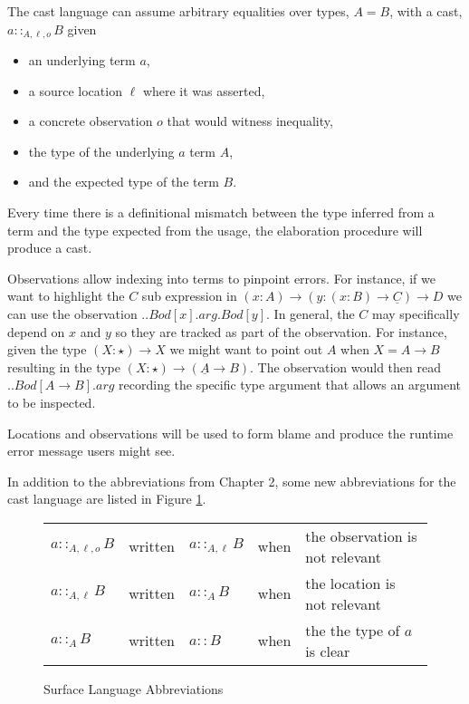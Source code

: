 The cast language can assume arbitrary equalities over types, $A=B$, with a cast, $a::_{A,\ensuremath{\ell},o}B$ given
\begin{itemize}
\item an underlying term $a$,
\item a source location $\ell$ where it was asserted,
\item a concrete observation $o$ that would witness inequality,
\item the type of the underlying $a$ term $A$,
\item and the expected type of the term $B$.
\end{itemize}
Every time there is a definitional mismatch between the type inferred from a term and the type expected from the usage, the elaboration procedure will produce a cast.
 
Observations allow indexing into terms to pinpoint errors.
For instance, if we want to highlight the $C$ sub expression in $\left(x:A\right)\rightarrow\left(y:\left(x:B\right)\rightarrow\underline{C}\right)\rightarrow D$ we can use the observation $..Bod[x].arg.Bod[y]$.
In general, the $C$ may specifically depend on $x$ and $y$ so they are tracked as part of the observation.
For instance, given the type $\left(X:\star\right)\rightarrow X$ we might want to point out $A$ when $X=A\rightarrow B$ resulting in the type $\left(X:\star\right)\rightarrow\left(\underline{A}\rightarrow B\right)$.
The observation would then read $..Bod[A\rightarrow B].arg$ recording the specific type argument that allows an argument to be inspected.
 
Locations and observations will be used to form blame and produce the runtime error message users might see.
 
In addition to the abbreviations from Chapter 2, some new abbreviations for the cast language are listed in Figure \ref{fig:cast-pre-syntax-abrev}.
\begin{figure}
\begin{tabular}{lclll}
$a::_{A,\ensuremath{\ell},o}B$ & written & $a::_{A,\ensuremath{\ell}}B$ & when & the observation is not relevant\tabularnewline
$a::_{A,\ensuremath{\ell}}B$ & written & $a::_{A}B$ & when & the location is not relevant\tabularnewline
$a::_{A}B$ & written & $a::B$ & when & the the type of $a$is clear\tabularnewline
\end{tabular}
 
\caption{Surface Language Abbreviations}
\label{fig:cast-pre-syntax-abrev}
\end{figure}
 
